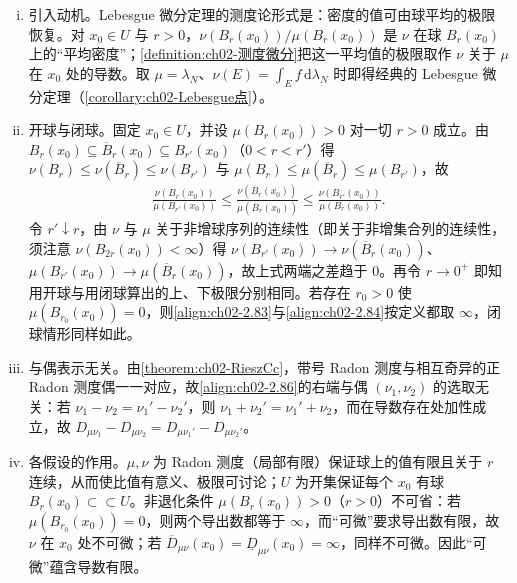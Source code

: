 \documentclass[../../main.tex]{subfiles}%
\begin{document}
\begin{remark}\label{remark:ch02-测度微分}
\begin{enumerate}[(i)]
\item 引入动机。Lebesgue 微分定理的测度论形式是：密度的值可由球平均的极限恢复。对 $x_0\in U$ 与 $r>0$，$\nu(B_r(x_0))/\mu(B_r(x_0))$ 是 $\nu$ 在球 $B_r(x_0)$ 上的“平均密度”；\cref{definition:ch02-测度微分}把这一平均值的极限取作 $\nu$ 关于 $\mu$ 在 $x_0$ 处的导数。取 $\mu=\lambda_N$、$\nu(E)=\int_Ef\,\mathrm{d}\lambda_N$ 时即得经典的 Lebesgue 微分定理（\cref{corollary:ch02-Lebesgue点}）。
\item 开球与闭球。固定 $x_0\in U$，并设 $\mu(B_r(x_0))>0$ 对一切 $r>0$ 成立。由 $B_r(x_0)\subseteq\overline{B}_r(x_0)\subseteq B_{r'}(x_0)$（$0<r<r'$）得 $\nu(B_r)\leqslant\nu(\overline{B}_r)\leqslant\nu(B_{r'})$ 与 $\mu(B_r)\leqslant\mu(\overline{B}_r)\leqslant\mu(B_{r'})$，故
\begin{align*}
\frac{\nu(B_r(x_0))}{\mu(B_{r'}(x_0))}\leqslant\frac{\nu(\overline{B}_r(x_0))}{\mu(\overline{B}_r(x_0))}\leqslant\frac{\nu(B_{r'}(x_0))}{\mu(B_r(x_0))}.
\end{align*}
令 $r'\downarrow r$，由 $\nu$ 与 $\mu$ 关于非增球序列的连续性（即关于非增集合列的连续性，须注意 $\nu(B_{2r}(x_0))<\infty$）得 $\nu(B_{r'}(x_0))\to\nu(\overline{B}_r(x_0))$、$\mu(B_{r'}(x_0))\to\mu(\overline{B}_r(x_0))$，故上式两端之差趋于 $0$。再令 $r\to0^+$ 即知用开球与用闭球算出的上、下极限分别相同。若存在 $r_0>0$ 使 $\mu(B_{r_0}(x_0))=0$，则\eqref{align:ch02-2.83}与\eqref{align:ch02-2.84}按定义都取 $\infty$，闭球情形同样如此。
\item 与偶表示无关。由\cref{theorem:ch02-RieszCc}，带号 Radon 测度与相互奇异的正 Radon 测度偶一一对应，故\eqref{align:ch02-2.86}的右端与偶 $(\nu_1,\nu_2)$ 的选取无关：若 $\nu_1-\nu_2=\nu_1'-\nu_2'$，则 $\nu_1+\nu_2'=\nu_1'+\nu_2$，而在导数存在处加性成立，故 $D_{\mu\nu_1}-D_{\mu\nu_2}=D_{\mu\nu_1'}-D_{\mu\nu_2'}$。
\item 各假设的作用。$\mu,\nu$ 为 Radon 测度（局部有限）保证球上的值有限且关于 $r$ 连续，从而使比值有意义、极限可讨论；$U$ 为开集保证每个 $x_0$ 有球 $B_r(x_0)\subset\subset U$。非退化条件 $\mu(B_r(x_0))>0$（$r>0$）不可省：若 $\mu(B_{r_0}(x_0))=0$，则两个导出数都等于 $\infty$，而“可微”要求导出数有限，故 $\nu$ 在 $x_0$ 处不可微；若 $\overline{D}_{\mu\nu}(x_0)=\underline{D}_{\mu\nu}(x_0)=\infty$，同样不可微。因此“可微”蕴含导数有限。
\end{enumerate}
\end{remark}
\end{document}
